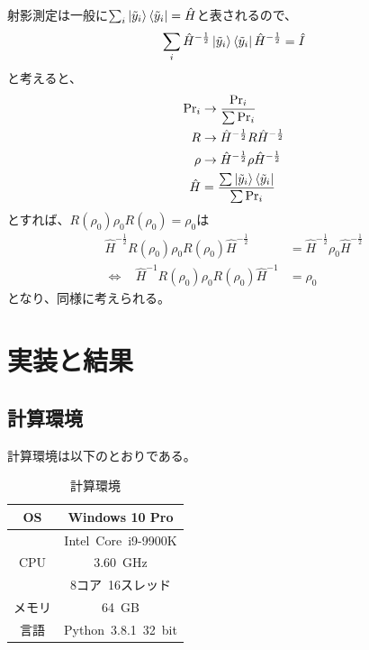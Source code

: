 \documentclass[11pt,a4j,notitlepage]{jreport}
\begin{document}
	射影測定は一般に$\sum_i \ket{\tilde{y}_i} \bra{\tilde{y}_i} = \hat{H}$と表されるので、
	\begin{equation}
		\sum_i \hat{H}^{- \frac{1}{2}} \ket{\tilde{y}_i} \bra{\tilde{y}_i} \hat{H}^{- \frac{1}{2}} = \hat{I}
	\end{equation}
	と考えると、
	\begin{equation*}
		\begin{aligned}
			{\Pr}_i &\to \frac{\Pr_i}{\sum \Pr_i} \\
			R &\to \hat{H}^{- \frac{1}{2}} R \hat{H}^{- \frac{1}{2}} \\
			\rho &\to \hat{H}^{- \frac{1}{2}} \rho \hat{H}^{- \frac{1}{2}} \\
			\hat{H} &= \frac{\sum \ket{\tilde{y}_i} \bra{\tilde{y}_i}}{\sum \Pr_i}
		\end{aligned}
	\end{equation*}
	とすれば、$R (\rho_0) \rho_0 R (\rho_0) = \rho_0$は
	\begin{equation}
		\begin{aligned}
			\hat{H}^{- \frac{1}{2}} R (\rho_0) \rho_0 R (\rho_0) \hat{H}^{- \frac{1}{2}} &= \hat{H}^{- \frac{1}{2}} \rho_0 \hat{H}^{- \frac{1}{2}} \\
			\Longleftrightarrow\ \ \ \  \hat{H}^{-1} R (\rho_0) \rho_0 R (\rho_0) \hat{H}^{-1} &= \rho_0
		\end{aligned}
	\end{equation}
	となり、同様に考えられる。

	\chapter{実装と結果}

	\section{計算環境}

	計算環境は以下のとおりである。

	\begin{table}[h]
		\centering
			\caption{計算環境}
			\begin{tabular}{|c|c|}
				\hline
				OS & Windows 10 Pro \\ \hline
				& Intel\ Core\ i9-9900K \\
				CPU & 3.60\ GHz \\
				& 8コア\ 16スレッド　\\ \hline
				メモリ & 64\ GB \\ \hline
				言語 & Python\ 3.8.1\ 32\ bit \\ \hline
			\end{tabular}
	\end{table}
\end{document}
